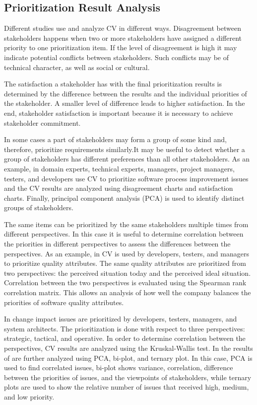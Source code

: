\subsection{Prioritization Result Analysis}

Different studies use and analyze CV in different ways. Disagreement
between stakeholders happens when two or more stakeholders have assigned
a different priority to one prioritization item. If the level of disagreement
is high it may indicate potential conflicts between stakeholders.
Such conflicts may be of technical character, as well as social or cultural.

The satisfaction a stakeholder has with the final prioritization results is
determined by the difference between the results and the individual priorities
of the stakeholder. A smaller level of difference leads to higher satisfaction.
In the end, stakeholder satisfaction is important because it is necessary to achieve
stakeholder commitment.

In some cases a part of stakeholders may form a group of some kind and, therefore, prioritize
requirements similarly.It may be useful
to detect whether a group of stakeholders has different preferences
than all other stakeholders. As an example, in \citep{Pettersson2008} domain experts,
technical experts, managers, project managers, testers, and developers
use CV to prioritize software process improvement issues and the CV results
are analyzed using disagreement charts and satisfaction charts.
Finally, principal component analysis (PCA) is used to identify distinct
groups of stakeholders.

The same items can be prioritized by the same stakeholders multiple times
from different perspectives. In this case it is useful to determine correlation between
the priorities in different perspectives to assess the differences
between the perspectives. As an example, in \citep{Barney2009b} CV is used by developers,
testers, and managers to prioritize quality attributes. The same quality
attributes are prioritized from two perspectives: the perceived situation
today and the perceived ideal situation. Correlation between the two perspectives
is evaluated using the Spearman rank correlation matrix. This allows an analysis of
how well the company balances the priorities of software quality attributes.

In \citep{Jonsson2005} change impact issues are prioritized by developers,
testers, managers, and system architects. The prioritization is done
with respect to three perspectives: strategic, tactical, and operative.
In order to determine correlation between the perspectives, CV results are
analyzed using the Kruskal-Wallis test. In \citep{Chatzipetrou2010} the
results of \citep{Jonsson2005} are further analyzed using PCA, bi-plot, and
ternary plot. In this case, PCA is used to find correlated issues, 
bi-plot shows variance, correlation, difference between
the priorities of issues, and the viewpoints of stakeholders, while ternary
plots are used to show the relative number of issues that received high,
medium, and low priority.

